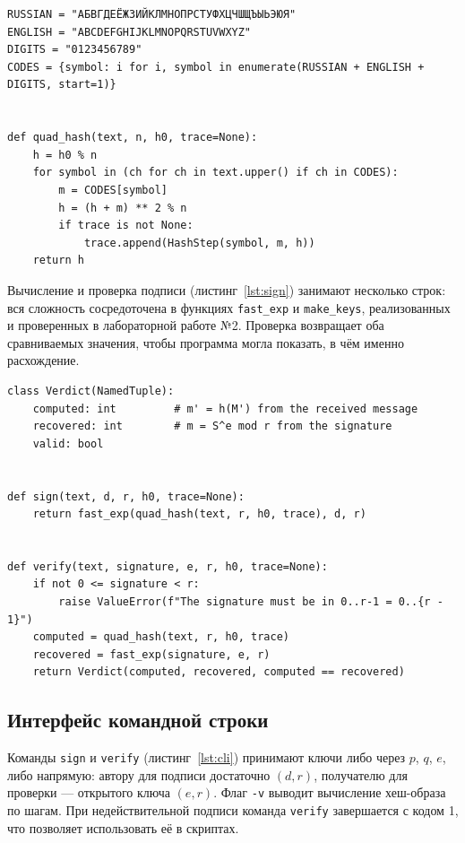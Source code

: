 \documentclass[14pt,a4paper]{extarticle}
\begin{document}
\begin{lstlisting}[style=python, caption={Квадратичная хеш-функция}, label={lst:hash}]
RUSSIAN = "АБВГДЕЁЖЗИЙКЛМНОПРСТУФХЦЧШЩЪЫЬЭЮЯ"
ENGLISH = "ABCDEFGHIJKLMNOPQRSTUVWXYZ"
DIGITS = "0123456789"
CODES = {symbol: i for i, symbol in enumerate(RUSSIAN + ENGLISH + DIGITS, start=1)}


def quad_hash(text, n, h0, trace=None):
    h = h0 % n
    for symbol in (ch for ch in text.upper() if ch in CODES):
        m = CODES[symbol]
        h = (h + m) ** 2 % n
        if trace is not None:
            trace.append(HashStep(symbol, m, h))
    return h
\end{lstlisting}

Вычисление и проверка подписи (листинг~\ref{lst:sign}) занимают несколько строк:
вся сложность сосредоточена в функциях \texttt{fast\_exp} и \texttt{make\_keys},
реализованных и проверенных в лабораторной работе №2. Проверка возвращает оба
сравниваемых значения, чтобы программа могла показать, в чём именно расхождение.

\begin{lstlisting}[style=python, caption={Вычисление и проверка подписи}, label={lst:sign}]
class Verdict(NamedTuple):
    computed: int         # m' = h(M') from the received message
    recovered: int        # m = S^e mod r from the signature
    valid: bool


def sign(text, d, r, h0, trace=None):
    return fast_exp(quad_hash(text, r, h0, trace), d, r)


def verify(text, signature, e, r, h0, trace=None):
    if not 0 <= signature < r:
        raise ValueError(f"The signature must be in 0..r-1 = 0..{r - 1}")
    computed = quad_hash(text, r, h0, trace)
    recovered = fast_exp(signature, e, r)
    return Verdict(computed, recovered, computed == recovered)
\end{lstlisting}

\subsection{Интерфейс командной строки}

Команды \texttt{sign} и \texttt{verify} (листинг~\ref{lst:cli}) принимают ключи либо
через $p$, $q$, $e$, либо напрямую: автору для подписи достаточно $(d, r)$, получателю
для проверки --- открытого ключа $(e, r)$. Флаг \texttt{-v} выводит вычисление
хеш-образа по шагам. При недействительной подписи команда \texttt{verify} завершается
с кодом 1, что позволяет использовать её в скриптах.
\end{document}
